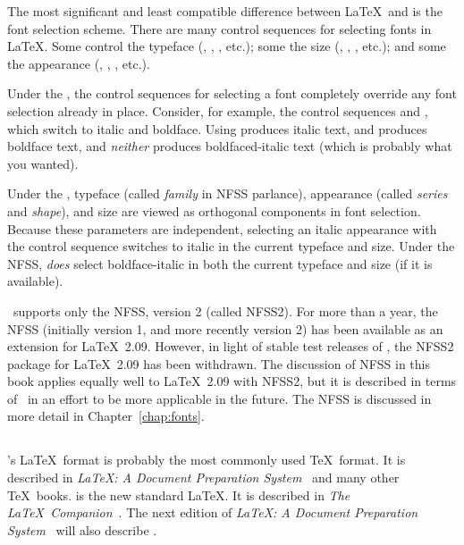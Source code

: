 The most significant and least compatible difference between \LaTeX\
and \LaTeXe{} is the font selection scheme.
There are many control sequences for selecting fonts in \LaTeX.  Some
control the typeface (\cs{rm}, \cs{tt}, \cs{sc}, etc.);
some the size (, , , etc.);
and some the appearance (, , , etc.).
  
Under the , the control sequences for
selecting a font completely override any font selection already in place.
Consider, for example, the control sequences  and ,
which switch to italic and boldface.  Using \cs{bf}\cs{it} produces italic
text, and \cs{it}\cs{bf} produces boldface text, and {\em neither} produces
boldfaced-italic text (which is probably what you wanted).

Under the , typeface 
(called \textit{family}
in NFSS parlance), appearance (called \textit{series} and \textit{shape}), and
size are viewed as orthogonal components in font selection.  Because these
parameters are independent, selecting an italic appearance with the 
control sequence switches to italic in the current typeface and size.  Under
the NFSS, \cs{bf}\cs{it} \textit{does} select boldface-italic in both the current
typeface and size (if it is available).

\LaTeXe\ supports only the NFSS, 
version 2 (called NFSS2).  For 
more than a year, the NFSS (initially
version 1, and more recently version 2) has been available as an
extension for \LaTeX\ 2.09.  However, in light of stable test releases of
\LaTeXe, the NFSS2 package for \LaTeX\ 2.09 has been withdrawn.  The
discussion of NFSS in this book applies equally well to \LaTeX\ 2.09 with
NFSS2, but it is described in terms of \LaTeXe\ in an effort to be more
applicable in the future.
The NFSS is discussed in more detail in Chapter~\ref{chap:fonts}.

\subsection{\protect\LaTeXe}
\label{sec:latexe}

's \LaTeX\ format 
is probably the most commonly used \TeX\
format.  It is described in {\it \LaTeX: A Document Preparation
System}~\cite{ll:latexbook} and many other \TeX\ books.   is 
the new
standard \LaTeX.  It is described in \textit{The \LaTeX\
Companion}~\cite{latexcompanion}.  The next edition of {\it \LaTeX: A Document
Preparation System}~\cite{ll:latexbook}
will also describe \LaTeXe.

